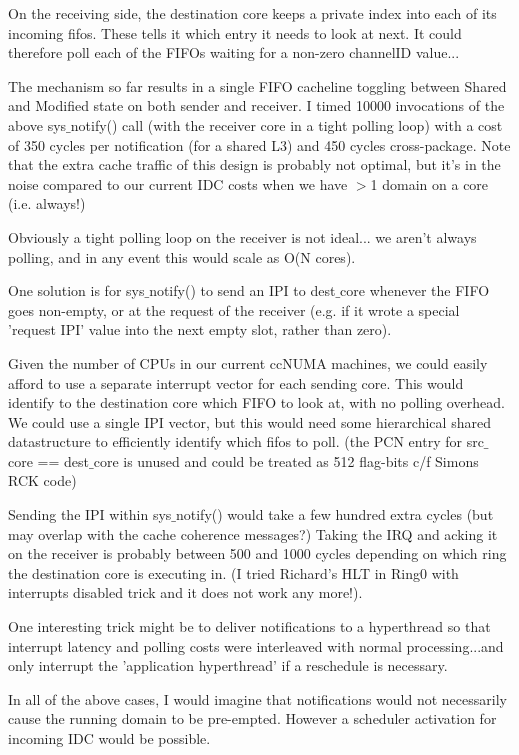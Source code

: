 \documentclass[a4paper,11pt,twoside]{report}
\begin{document}
On the receiving side, the destination core keeps a private index into
each of its incoming fifos.  These tells it which entry it needs to
look at next.  It could therefore poll each of the FIFOs waiting for a
non-zero channelID value...

The mechanism so far results in a single FIFO cacheline toggling
between Shared and Modified state on both sender and receiver.  I
timed 10000 invocations of the above sys$\_$notify() call (with the
receiver core in a tight polling loop) with a cost of 350 cycles per
notification (for a shared L3) and 450 cycles cross-package.  Note
that the extra cache traffic of this design is probably not optimal,
but it's in the noise compared to our current IDC costs when we have
$>$1 domain on a core (i.e. always!)

Obviously a tight polling loop on the receiver is not ideal...  we
aren't always polling, and in any event this would scale as O(N
cores).

One solution is for sys$\_$notify() to send an IPI to dest$\_$core
whenever the FIFO goes non-empty, or at the request of the receiver
(e.g. if it wrote a special 'request IPI' value into the next empty
slot, rather than zero).

Given the number of CPUs in our current ccNUMA machines, we could
easily afford to use a separate interrupt vector for each sending
core.  This would identify to the destination core which FIFO to look
at, with no polling overhead.  We could use a single IPI vector, but
this would need some hierarchical shared datastructure to efficiently
identify which fifos to poll.  (the PCN entry for src$\_$core ==
dest$\_$core is unused and could be treated as 512 flag-bits c/f Simons
RCK code)

Sending the IPI within sys$\_$notify() would take a few hundred extra
cycles (but may overlap with the cache coherence messages?)  Taking
the IRQ and acking it on the receiver is probably between 500 and 1000
cycles depending on which ring the destination core is executing in.
(I tried Richard's HLT in Ring0 with interrupts disabled trick and it
does not work any more!).

One interesting trick might be to deliver notifications to a
hyperthread so that interrupt latency and polling costs were
interleaved with normal processing...and only interrupt the
'application hyperthread' if a reschedule is necessary.

In all of the above cases, I would imagine that notifications would
not necessarily cause the running domain to be pre-empted.  However a
scheduler activation for incoming IDC would be possible.
  
\end{document}
